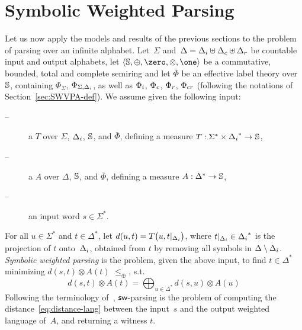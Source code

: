 



\section{Symbolic Weighted Parsing}
\label{sec:parsing}

Let us now apply the models and results of the previous sections %
to the problem of parsing over an infinite alphabet. %
%
%
Let~$\Sigma$
and~$\Delta = \Deltai \uplus \Deltac \uplus \Deltar$
be countable input and output alphabets,
let $\< \Semiring, \oplus, \zero, \otimes, \one>$ be a
commutative, bounded, total and complete %
semiring and let $\bar\Phi$ be an effective label theory over $\mathbb{S}$,
containing $\Phi_\Sigma$, $\Phi_{\Sigma, \Deltai}$, as well as
$\Phii$, $\Phic$, $\Phir$, $\Phicr$
(following the notations of Section~\ref{sec:SWVPA-def}).
%
\noindent
We assume given the following input:
\begin{description}
\item[--] a \SWT $T$ over $\Sigma$, $\Deltai$, $\mathbb{S}$, and $\bar\Phi$,
defining a measure %
$T: \Sigma^* \times \Deltai^* \to \Semiring$,

\item[--] a \SWVPA $A$ over $\Delta$, $\mathbb{S}$, and $\bar\Phi$,
defining a measure $A: \Delta^* \to \mathbb{S}$,
\item[--] an input word $s \in \Sigma^*$.
\end{description}
%
For all $u \in \Sigma^*$ and $t \in \Delta^*$, let
\(d(u, t) = T\bigl(u, t|_\Deltai \bigr)\),
where $t|_\Deltai \in \Deltai^*$ is the projection of $t$ onto~$\Deltai$,
obtained from $t$ by removing all symbols in $\Delta \setminus \Deltai$.
%
\noindent
\emph{Symbolic weighted parsing} is the problem,
given the above input,
to find $t \in \Delta^*$ %
minimizing \( d(s, t) \otimes A(t)\)
\wrt $\leq_\oplus$,
\ie s.t. %
%
\begin{equation}\label{eq:distance-lang}
d(s, t) \otimes A(t) = \displaystyle\bigoplus_{u \in \Delta^*} d(s, u) \otimes A(u)
\end{equation}
%
Following the terminology of~\cite{Mohri03EDWA},
$\textsf{sw}$-parsing is the problem of computing
the distance~\eqref{eq:distance-lang} between the input~$s$ and the output weighted language of~$A$,
and returning a witness $t$.

